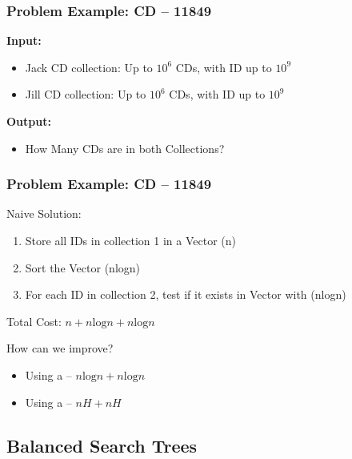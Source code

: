 \documentclass{beamer}
\begin{document}
\begin{frame}
  \frametitle{Problem Example: CD -- 11849}

  \begin{block}{}
    {\bf Input:}
    \begin{itemize}
    \item Jack CD collection: Up to $10^6$ CDs, with ID up to $10^9$
    \item Jill CD collection: Up to $10^6$ CDs, with ID up to $10^9$
    \end{itemize}

    {\bf Output:}
    \begin{itemize}
    \item How Many CDs are in both Collections?
    \end{itemize}
    
  \end{block}
\end{frame}

\begin{frame}
  \frametitle{Problem Example: CD -- 11849}

  Naive Solution:

  \begin{enumerate}
  \item Store all IDs in collection 1 in a Vector (n)
  \item Sort the Vector (nlogn)
  \item For each ID in collection 2, test if it exists in Vector with  (nlogn)
  \end{enumerate}

  Total Cost: $n + n\text{log}n + n\text{log}n$
  
  \bigskip

  How can we improve?
  \begin{itemize}
  \item Using a  -- $n\text{log}n + n\text{log}n$
  \item Using a  -- $nH + nH$
  \end{itemize}
\end{frame}

\subsection{Balanced Search Trees}
\end{document}
